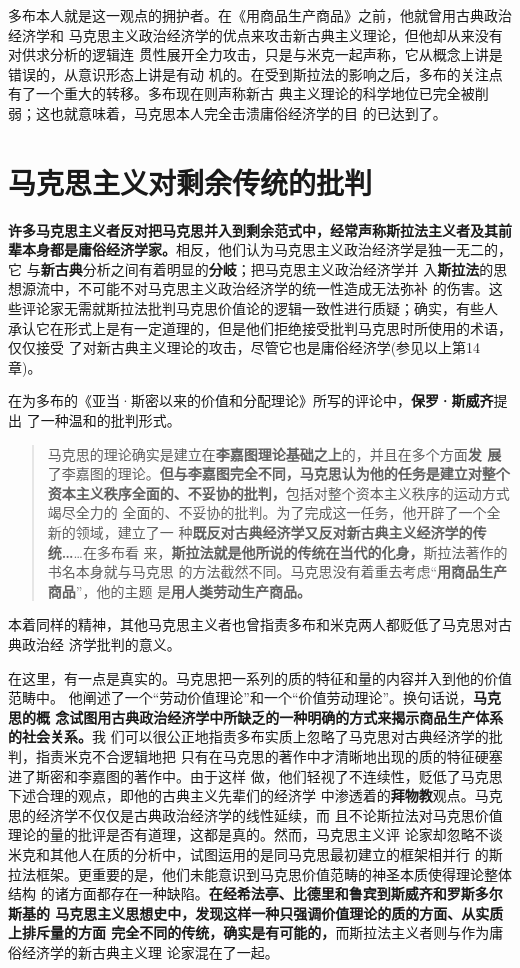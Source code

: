 多布本人就是这一观点的拥护者。在《用商品生产商品》之前，他就曾用古典政治经济学和
马克思主义政治经济学的优点来攻击新古典主义理论，但他却从来没有对供求分析的逻辑连
贯性展开全力攻击，只是与米克一起声称，它从概念上讲是错误的，从意识形态上讲是有动
机的。在受到斯拉法的影响之后，多布的关注点有了一个重大的转移。多布现在则声称新古
典主义理论的科学地位已完全被削弱；这也就意味着，马克思本人完全击溃庸俗经济学的目
的已达到了。

\section{马克思主义对剩余传统的批判}

\textbf{许多马克思主义者反对把马克思并入到剩余范式中，经常声称斯拉法主义者及其前
  辈本身都是庸俗经济学家。}相反，他们认为马克思主义政治经济学是独一无二的，它
与\textbf{新古典}分析之间有着明显的\textbf{分岐}；把马克思主义政治经济学并
入\textbf{斯拉法}的思想源流中，不可能不对马克思主义政治经济学的统一性造成无法弥补
的伤害。这些评论家无需就斯拉法批判马克思价值论的逻辑一致性进行质疑；确实，有些人
承认它在形式上是有一定道理的，但是他们拒绝接受批判马克思时所使用的术语，仅仅接受
了对新古典主义理论的攻击，尽管它也是庸俗经济学(参见以上第14章)。

在为多布的《亚当·斯密以来的价值和分配理论》所写的评论中，\textbf{保罗·斯威齐}提出
了一种温和的批判形式。
\begin{quotation}
  马克思的理论确实是建立在\textbf{李嘉图理论基础之上}的，并且在多个方面\textbf{发
    展}了李嘉图的理论。\textbf{但与李嘉图完全不同，马克思认为他的任务是建立对整个
    资本主义秩序全面的、不妥协的批判，}包括对整个资本主义秩序的运动方式竭尽全力的
  全面的、不妥协的批判。为了完成这一任务，他开辟了一个全新的领域，建立了一
  种\textbf{既反对古典经济学又反对新古典主义经济学的传统…}…在多布看
  来，\textbf{斯拉法就是他所说的传统在当代的化身，}斯拉法著作的书名本身就与马克思
  的方法截然不同。马克思没有着重去考虑“\textbf{用商品生产商品}”，他的主题
  是\textbf{用人类劳动生产商品。}
\end{quotation}
本着同样的精神，其他马克思主义者也曾指责多布和米克两人都贬低了马克思对古典政治经
济学批判的意义。

在这里，有一点是真实的。马克思把一系列的质的特征和量的内容并入到他的价值范畴中。
他阐述了一个“劳动价值理论”和一个“价值劳动理论”。换句话说，\textbf{马克思的概
  念试图用古典政治经济学中所缺乏的一种明确的方式来揭示商品生产体系的社会关系。}我
们可以很公正地指责多布实质上忽略了马克思对古典经济学的批判，指责米克不合逻辑地把
只有在马克思的著作中才清晰地出现的质的特征硬塞进了斯密和李嘉图的著作中。由于这样
做，他们轻视了不连续性，贬低了马克思下述合理的观点，即他的古典主义先辈们的经济学
中渗透着的\textbf{拜物教}观点。马克思的经济学不仅仅是古典政治经济学的线性延续，而
且不论斯拉法对马克思价值理论的量的批评是否有道理，这都是真的。然而，马克思主义评
论家却忽略不谈米克和其他人在质的分析中，试图运用的是同马克思最初建立的框架相并行
的斯拉法框架。更重要的是，他们未能意识到马克思价值范畴的神圣本质使得理论整体结构
的诸方面都存在一种缺陷。\textbf{在经希法亭、比德里和鲁宾到斯威齐和罗斯多尔斯基的
  马克思主义思想史中，发现这样一种只强调价值理论的质的方面、从实质上排斥量的方面
  完全不同的传统，确实是有可能的，}而斯拉法主义者则与作为庸俗经济学的新古典主义理
论家混在了一起。

